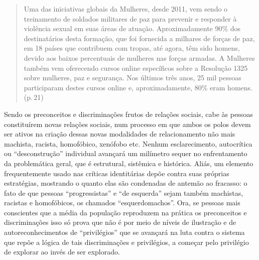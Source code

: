 \begin{quote}
Uma das iniciativas globais da  Mulheres, desde 2011, vem sendo o
treinamento de soldados militares de paz para prevenir e responder à
violência sexual em suas áreas de atuação. Aproximadamente 90\% dos
destinatários desta formação, que foi fornecida a milhares de forças de
paz, em 18 países que contribuem com tropas, até agora, têm sido homens,
devido aos baixos percentuais de mulheres nas forças armadas. A 
Mulheres também vem oferecendo cursos online específicos sobre a
Resolução 1325 sobre mulheres, paz e segurança. Nos últimos três anos,
25 mil pessoas participaram destes cursos online e, aproximadamente,
80\% eram homens. (p.\,21)
\end{quote}

Sendo os preconceitos e discriminações frutos de relações sociais, cabe
às pessoas constituírem novas relações sociais, num processo em que
ambos os polos devem ser ativos na criação dessas novas modalidades de
relacionamento não mais machista, racista, homofóbico, xenófobo etc.
Nenhum esclarecimento, autocrítica ou ``desconstrução'' individual
avançará um milímetro sequer no enfrentamento da problemática geral, que
é estrutural, sistêmica e histórica. Aliás, um elemento frequentemente
usado nas críticas identitárias depõe contra suas próprias estratégias,
mostrando o quanto elas são condenadas de antemão ao fracasso: o fato de
que pessoas ``progressistas'' e ``de esquerda'' sejam também machistas,
racistas e homofóbicos, os chamados ``esquerdomachos''. Ora, se pessoas
mais conscientes que a média da população reproduzem na prática os
preconceitos e discriminações isso só prova que não é por meio de níveis
de ilustração e de autoreconhecimentos de ``privilégios'' que se
avançará na luta contra o sistema que repõe a lógica de tais
discriminações e privilégios, a começar pelo privilégio de explorar ao
invés de ser explorado.

